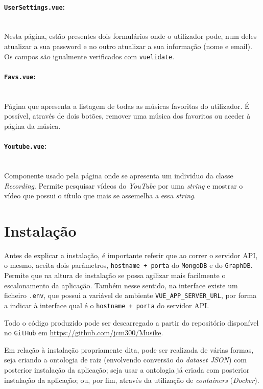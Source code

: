 \documentclass{article}
\begin{document}
\paragraph{\texttt{UserSettings.vue}:}\mbox{}\\

Nesta página, estão presentes dois formulários onde o utilizador pode, num deles atualizar a sua password e no outro atualizar a sua informação (nome e email). Os campos são igualmente verificados com \texttt{vuelidate}.

\paragraph{\texttt{Favs.vue}:}\mbox{}\\

Página que apresenta a listagem de todas as músicas favoritas do utilizador. É possível, através de dois botões, remover uma música dos favoritos ou aceder à página da música.

\paragraph{\texttt{Youtube.vue}:}\mbox{}\\

Componente usado pela página onde se apresenta um individuo da classe \textit{Recording}. Permite pesquisar vídeos do \textit{YouTube} por uma \textit{string} e mostrar o vídeo que possui o título que mais se assemelha a essa \textit{string}.

\section{Instalação} \label{install}

Antes de explicar a instalação, é importante referir que ao correr o servidor API, o mesmo, aceita dois parâmetros, \texttt{hostname + porta} do \texttt{MongoDB} e do \texttt{GraphDB}. Permite que na altura de instalação se possa agilizar mais facilmente o escalonamento da aplicação. Também nesse sentido, na interface existe um ficheiro \texttt{.env}, que possui a variável de ambiente \texttt{VUE\_APP\_SERVER\_URL}, por forma a indicar à interface qual é o \texttt{hostname + porta} do servidor API.

Todo o código produzido pode ser descarregado a partir do repositório disponível no \texttt{GitHub} em \url{https://github.com/jcm300/Musike}. 

Em relação à instalação propriamente dita, pode ser realizada de várias formas, seja criando a ontologia de raiz (envolvendo conversão do \textit{dataset JSON}) com posterior instalação da aplicação; seja usar a ontologia já criada com posterior instalação da aplicação; ou, por fim, através da utilização de \textit{containers} (\textit{Docker}).
\end{document}
